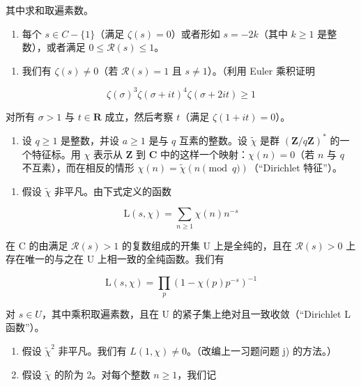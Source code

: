 其中求和取遍素数。

\begin{enumerate}
\def\labelenumi{\roman{enumi})}
\tightlist
\item
  每个 \(s \in C - \{1\}\)（满足 \(\zeta(s) = 0\)）或者形如 \(s = -2k\)（其中 \(k \geqslant 1\) 是整数），或者满足 \(0 \leqslant \mathcal{R}(s) \leqslant 1\)。
\end{enumerate}

\begin{enumerate}
\def\labelenumi{\alph{enumi})}
\setcounter{enumi}{9}
\tightlist
\item
  我们有 \(\zeta(s) \neq 0\)（若 \(\mathcal{R}(s) = 1\) 且 \(s \neq 1\)）。（利用 Euler 乘积证明
\end{enumerate}

\[
\zeta (\sigma) ^ {3} \zeta (\sigma + i t) ^ {4} \zeta (\sigma + 2 i t) \geqslant 1
\]

对所有 \(\sigma > 1\) 与 \(t \in \mathbf{R}\) 成立，然后考察 \(t\)（满足 \(\zeta(1 + it) = 0\)）。

\begin{enumerate}
\def\labelenumi{\arabic{enumi})}
\setcounter{enumi}{16}
\tightlist
\item
  设 \(q \geqslant 1\) 是整数，并设 \(a \geqslant 1\) 是与 \(q\) 互素的整数。设 \(\widetilde{\chi}\) 是群 \((\mathbf{Z}/q\mathbf{Z})^*\) 的一个特征标。用 \(\chi\) 表示从 \(\mathbf{Z}\) 到 \(\mathbf{C}\) 中的这样一个映射：\(\chi(n) = 0\)（若 \(n\) 与 \(q\) 不互素），而在相反的情形 \(\chi(n) = \widetilde{\chi}(n \pmod{q})\)（“Dirichlet 特征”）。
\end{enumerate}

\begin{enumerate}
\def\labelenumi{\alph{enumi})}
\tightlist
\item
  假设 \(\widetilde{\chi}\) 非平凡。由下式定义的函数
\end{enumerate}

\[
\mathrm{L} (s, \chi) = \sum_ {n \geqslant 1} \chi (n) n ^ {- s}
\]

在 C 的由满足 \(\mathcal{R}(s) > 1\) 的复数组成的开集 U 上是全纯的，且在 \(\mathcal{R}(s) > 0\) 上存在唯一的与之在 U 上相一致的全纯函数。我们有

\[
\mathrm{L} (s, \chi) = \prod_ {p} (1 - \chi (p) p ^ {- s}) ^ {- 1}
\]

对 \(s \in U\)，其中乘积取遍素数，且在 U 的紧子集上绝对且一致收敛（“Dirichlet L 函数”）。

\begin{enumerate}
\def\labelenumi{\alph{enumi})}
\setcounter{enumi}{1}
\item
  假设 \(\widetilde{\chi}^{2}\) 非平凡。我们有 \(L(1,\chi)\neq0\)。（改编上一习题问题 j) 的方法。）
\item
  假设 \(\widetilde{\chi}\) 的阶为 2。对每个整数 \(n \geqslant 1\)，我们记
\end{enumerate}

